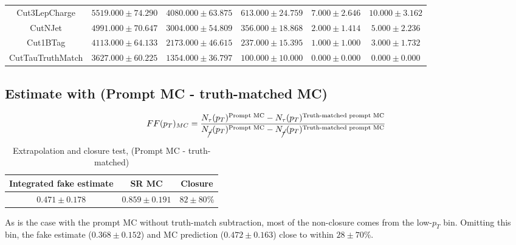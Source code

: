 \documentclass[11pt]{article}
\begin{document}
\begin{table}[htp]
{\begin{tabular}{|c|c|c|c|c|c|}
		Cut3LepCharge    &      $5519.000 \pm 74.290$ &      $4080.000 \pm 63.875$ &          $613.000 \pm 24.759$ &           $7.000 \pm 2.646$ &          $10.000 \pm 3.162$ \\
		CutNJet          &      $4991.000 \pm 70.647$ &      $3004.000 \pm 54.809$ &          $356.000 \pm 18.868$ &           $2.000 \pm 1.414$ &           $5.000 \pm 2.236$\\
		Cut1BTag         &      $4113.000 \pm 64.133$ &      $2173.000 \pm 46.615$ &          $237.000 \pm 15.395$ &           $1.000 \pm 1.000$ &           $3.000 \pm 1.732$ \\
		CutTauTruthMatch &      $3627.000 \pm 60.225$ &      $1354.000 \pm 36.797$ &          $100.000 \pm 10.000$ &           $0.000 \pm 0.000$ &           $0.000 \pm 0.000$ \\
		\hline
		\end{tabular}}
	\end{table}


	\clearpage
	\subsection{Estimate with (Prompt MC - truth-matched MC)} 
	\begin{equation}
		FF(p_T)_{MC} = \frac{N_\tau (p_T)^{\text{Prompt MC}} - N_\tau (p_T)^{\text{Truth-matched prompt MC}}}{N_{\cancel{\tau}} (p_T)^{\text{Prompt MC}} - N_{\cancel{\tau}} (p_T)^{\text{Truth-matched prompt MC}}}
	\end{equation}

	\begin{table}[htp]
	\caption{Extrapolation and closure test, (Prompt MC - truth-matched)}
	\begin{center}
	\begin{tabular}{|c|c|c|}
	\hline
	Integrated fake estimate	& SR MC	& Closure \\
	\hline
	$0.471\pm0.178$ 		& $0.859\pm0.191$ 		& $82\pm80$\% \\
	\hline
	\end{tabular}
	\end{center}
	\label{default}
	\end{table}%

	As is the case with the prompt MC without truth-match subtraction, most of the non-closure comes from the low-$p_T$ bin. Omitting this bin, the fake estimate ($0.368\pm0.152$) and MC prediction ($0.472\pm0.163$) close to within $28\pm70$\%. 
\end{document}

